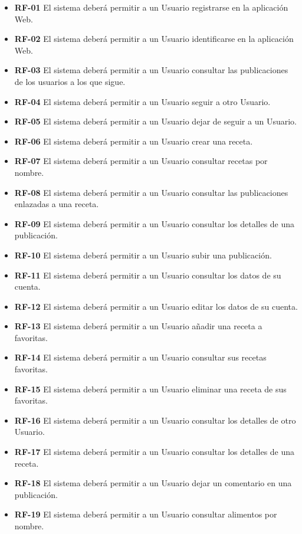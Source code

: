 \begin{itemize}
    \item \textbf{RF-01} El sistema deberá permitir a un Usuario registrarse en la aplicación Web.
 \item \textbf{RF-02} El sistema deberá permitir a un Usuario identificarse en la aplicación Web.
 \item \textbf{RF-03} El sistema deberá permitir a un Usuario consultar las publicaciones de los usuarios a los que sigue.
 \item \textbf{RF-04} El sistema deberá permitir a un Usuario seguir a otro Usuario.
 \item \textbf{RF-05} El sistema deberá permitir a un Usuario dejar de seguir a un Usuario.
 \item \textbf{RF-06} El sistema deberá permitir a un Usuario crear una receta.
 \item \textbf{RF-07} El sistema deberá permitir a un Usuario consultar recetas por nombre.
 \item \textbf{RF-08} El sistema deberá permitir a un Usuario consultar las publicaciones enlazadas a una receta.
 \item \textbf{RF-09} El sistema deberá permitir a un Usuario consultar los detalles de una publicación.
 \item \textbf{RF-10} El sistema deberá permitir a un Usuario subir una publicación.
 \item \textbf{RF-11} El sistema deberá permitir a un Usuario consultar los datos de su cuenta.
 \item \textbf{RF-12} El sistema deberá permitir a un Usuario editar los datos de su cuenta.
 \item \textbf{RF-13} El sistema deberá permitir a un Usuario añadir una receta a favoritas.
 \item \textbf{RF-14} El sistema deberá permitir a un Usuario consultar sus recetas favoritas.
 \item \textbf{RF-15} El sistema deberá permitir a un Usuario eliminar una receta de sus favoritas.
 \item \textbf{RF-16} El sistema deberá permitir a un Usuario consultar los detalles de otro Usuario.
 \item \textbf{RF-17} El sistema deberá permitir a un Usuario consultar los detalles de una receta.
 \item \textbf{RF-18} El sistema deberá permitir a un Usuario dejar un comentario en una publicación.
 \item \textbf{RF-19} El sistema deberá permitir a un Usuario consultar alimentos por nombre.

\end{itemize}
